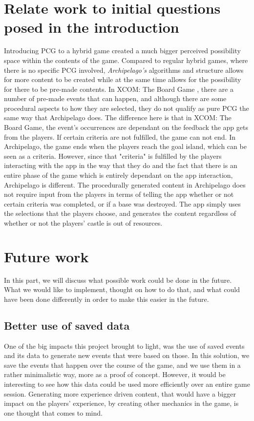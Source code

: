\section{Relate work to initial questions posed in the introduction}
Introducing PCG to a hybrid game created a much bigger perceived possibility space within the contents of the game. Compared to regular hybrid games, where there is no specific PCG involved, \textit{Archipelago's} algorithms and structure allows for more content to be created while at the same time allows for the possibility for there to be pre-made contents. In XCOM: The Board Game \cite{game:xcomtbg}, there are a number of pre-made events that can happen, and although there are some procedural aspects to how they are selected, they do not qualify as pure PCG the same way that Archipelago does. The difference here is that in XCOM: The Board Game, the event's occurrences are dependant on the feedback the app gets from the players. If certain criteria are not fulfilled, the game can not end. In Archipelago, the game ends when the players reach the goal island, which can be seen as a criteria. However, since that "criteria" is fulfilled by the players interacting with the app in the way that they do and the fact that there is an entire phase of the game which is entirely dependant on the app interaction, Archipelago is different. The procedurally generated content in Archipelago does not require input from the players in terms of telling the app whether or not certain criteria was completed, or if a base was destroyed. The app simply uses the selections that the players choose, and generates the content regardless of whether or not the players' castle is out of resources.

\section{Future work}
In this part, we will discuss what possible work could be done in the future. What we would like to implement, thought on how to do that, and what could have been done differently in order to make this easier in the future.
\subsection{Better use of saved data}
\label{sec:savdat}
One of the big impacts this project brought to light, was the use of saved events and its data to generate new events that were based on those. In this solution, we save the events that happen over the course of the game, and we use them in a rather minimalistic way, more as a proof of concept. However, it would be interesting to see how this data could be used more efficiently over an entire game session. Generating more experience driven content, that would have a bigger impact on the players' experience, by creating other mechanics in the game, is one thought that comes to mind. 

